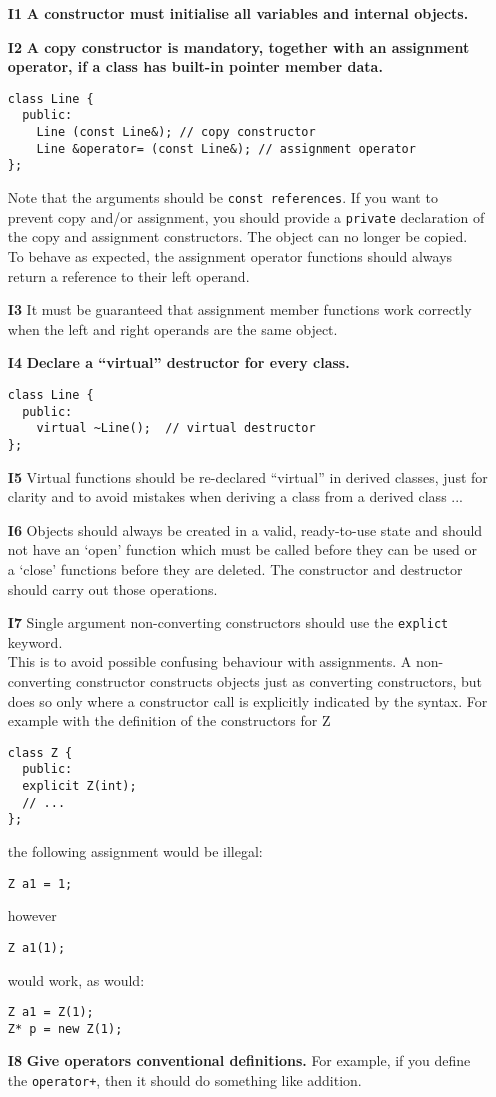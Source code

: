 \documentclass[a4paper,10pt]{article}
\begin{document}
\begin{itemize}
\item[\bf I1] {\bf A constructor must initialise all variables and internal
  objects.}
\item[\bf I2] {\bf A copy constructor is mandatory, together with an assignment
  operator, if a class has built-in pointer member data.}
  \begin{verbatim}
class Line {
  public:
    Line (const Line&); // copy constructor
    Line &operator= (const Line&); // assignment operator
};
  \end{verbatim}
  Note that the arguments should be {\tt const references}. If you want to
  prevent copy and/or assignment, you should provide a {\tt private}
  declaration of the copy and assignment constructors. The object can no
  longer be copied.\\
  To behave as expected, the assignment operator functions should always
  return a reference to their left operand.
\item[\bf I3] It must be guaranteed that assignment member functions work
  correctly when the left and right operands are the same object.
\item[\bf I4] {\bf Declare a ``virtual'' destructor for every class.}
  \begin{verbatim}
class Line {
  public:
    virtual ~Line();  // virtual destructor
};
  \end{verbatim}
\item[\bf I5] Virtual functions should be re-declared ``virtual'' in derived
  classes, just for clarity and to avoid mistakes when deriving a class from
  a derived class ...
\item[\bf I6] Objects should always be created in a valid, ready-to-use state
  and should not have an `open' function which must be called
  before they can be used or a `close' functions before they are deleted.
  The constructor and destructor should carry out those operations.
\item[\bf I7] Single argument non-converting constructors should use
  the {\tt explict} keyword.\\
  This is to avoid possible confusing behaviour with assignments. A
  non-converting constructor constructs objects just as converting
  constructors, but does so only where a constructor call is explicitly
  indicated by the syntax. For example with the definition of the
  constructors for Z
  \begin{verbatim}
class Z {
  public:
  explicit Z(int);
  // ...
};
  \end{verbatim}
  the following assignment would be illegal:
  \begin{verbatim}
Z a1 = 1;
  \end{verbatim}
  however
  \begin{verbatim}
Z a1(1);
  \end{verbatim}
  would work, as would:
  \begin{verbatim}
Z a1 = Z(1);
Z* p = new Z(1);
  \end{verbatim}
\item[\bf I8] {\bf Give operators conventional definitions.} For example,
  if you define the {\tt operator+}, then it should do something like addition.


\end{itemize}
\end{document}
